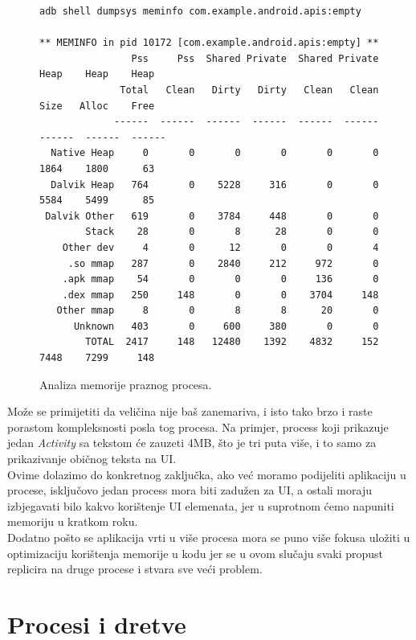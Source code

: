 \documentclass[times, utf8, zavrsni]{fer}
\begin{document}
\begin{figure}[ht!]
\centering
\begingroup
    \fontsize{8pt}{12pt}\selectfont
		\begin{verbatim}
adb shell dumpsys meminfo com.example.android.apis:empty

** MEMINFO in pid 10172 [com.example.android.apis:empty] **
                Pss     Pss  Shared Private  Shared Private    Heap    Heap    Heap
              Total   Clean   Dirty   Dirty   Clean   Clean    Size   Alloc    Free
             ------  ------  ------  ------  ------  ------  ------  ------  ------
  Native Heap     0       0       0       0       0       0    1864    1800      63
  Dalvik Heap   764       0    5228     316       0       0    5584    5499      85
 Dalvik Other   619       0    3784     448       0       0
        Stack    28       0       8      28       0       0
    Other dev     4       0      12       0       0       4
     .so mmap   287       0    2840     212     972       0
    .apk mmap    54       0       0       0     136       0
    .dex mmap   250     148       0       0    3704     148
   Other mmap     8       0       8       8      20       0
      Unknown   403       0     600     380       0       0
        TOTAL  2417     148   12480    1392    4832     152    7448    7299     148
		\end{verbatim}
\endgroup
\caption{Analiza memorije praznog procesa.}
\label{overflow}
\end{figure}

Može se primijetiti da veličina nije baš zanemariva, i isto tako brzo i raste porastom kompleksnosti posla tog procesa. Na primjer, process koji prikazuje jedan \textit{Activity} sa tekstom će zauzeti 4MB, što je tri puta više, i to samo za prikazivanje običnog teksta na UI.\\

Ovime dolazimo do konkretnog zaključka, ako već moramo podijeliti aplikaciju u procese, isključovo jedan process mora biti zadužen za UI, a ostali moraju izbjegavati bilo kakvo korištenje UI elemenata, jer u suprotnom ćemo napuniti memoriju u kratkom roku.\\

Dodatno pošto se aplikacija vrti u više procesa mora se puno više fokusa uložiti u optimizaciju korištenja memorije u kodu jer se u ovom slučaju svaki propust replicira na druge procese i stvara sve veći problem.

\pagebreak
\chapter{Procesi i dretve}
\end{document}
